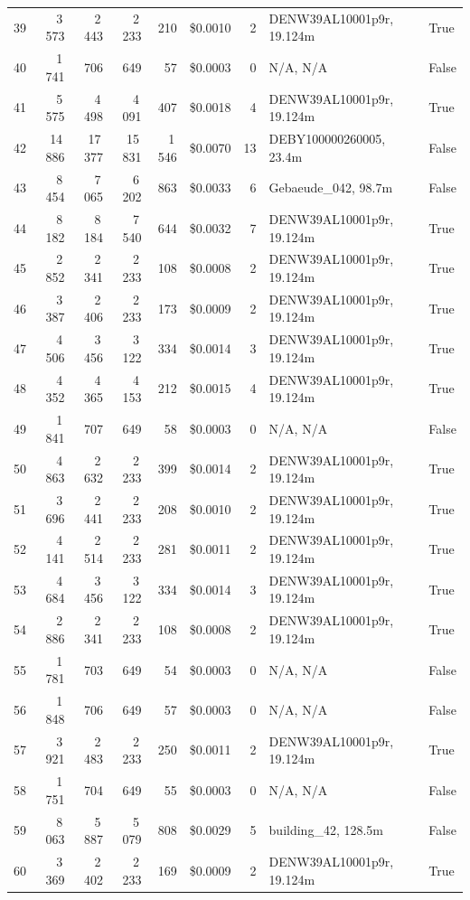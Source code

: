 \documentclass[a4paper,11pt]{article}
\begin{document}
\begin{table}[ht]
\begin{tabular}{r r r r r r r p{3cm} l}
39 & 3\,573 & 2\,443 & 2\,233 & 210 & \$0.0010 & 2 & DENW39AL10001p9r, 19.124m & True \\
40 & 1\,741 & 706 & 649 & 57 & \$0.0003 & 0 & N/A, N/A & False \\
41 & 5\,575 & 4\,498 & 4\,091 & 407 & \$0.0018 & 4 & DENW39AL10001p9r, 19.124m & True \\
42 & 14\,886 & 17\,377 & 15\,831 & 1\,546 & \$0.0070 & 13 & DEBY100000260005, 23.4m & False \\
43 & 8\,454 & 7\,065 & 6\,202 & 863 & \$0.0033 & 6 & Gebaeude\_042, 98.7m & False \\
44 & 8\,182 & 8\,184 & 7\,540 & 644 & \$0.0032 & 7 & DENW39AL10001p9r, 19.124m & True \\
45 & 2\,852 & 2\,341 & 2\,233 & 108 & \$0.0008 & 2 & DENW39AL10001p9r, 19.124m & True \\
46 & 3\,387 & 2\,406 & 2\,233 & 173 & \$0.0009 & 2 & DENW39AL10001p9r, 19.124m & True \\
47 & 4\,506 & 3\,456 & 3\,122 & 334 & \$0.0014 & 3 & DENW39AL10001p9r, 19.124m & True \\
48 & 4\,352 & 4\,365 & 4\,153 & 212 & \$0.0015 & 4 & DENW39AL10001p9r, 19.124m & True \\
49 & 1\,841 & 707 & 649 & 58 & \$0.0003 & 0 & N/A, N/A & False \\
50 & 4\,863 & 2\,632 & 2\,233 & 399 & \$0.0014 & 2 & DENW39AL10001p9r, 19.124m & True \\
51 & 3\,696 & 2\,441 & 2\,233 & 208 & \$0.0010 & 2 & DENW39AL10001p9r, 19.124m & True \\
52 & 4\,141 & 2\,514 & 2\,233 & 281 & \$0.0011 & 2 & DENW39AL10001p9r, 19.124m & True \\
53 & 4\,684 & 3\,456 & 3\,122 & 334 & \$0.0014 & 3 & DENW39AL10001p9r, 19.124m & True \\
54 & 2\,886 & 2\,341 & 2\,233 & 108 & \$0.0008 & 2 & DENW39AL10001p9r, 19.124m & True \\
55 & 1\,781 & 703 & 649 & 54 & \$0.0003 & 0 & N/A, N/A & False \\
56 & 1\,848 & 706 & 649 & 57 & \$0.0003 & 0 & N/A, N/A & False \\
57 & 3\,921 & 2\,483 & 2\,233 & 250 & \$0.0011 & 2 & DENW39AL10001p9r, 19.124m & True \\
58 & 1\,751 & 704 & 649 & 55 & \$0.0003 & 0 & N/A, N/A & False \\
59 & 8\,063 & 5\,887 & 5\,079 & 808 & \$0.0029 & 5 & building\_42, 128.5m & False \\
60 & 3\,369 & 2\,402 & 2\,233 & 169 & \$0.0009 & 2 & DENW39AL10001p9r, 19.124m & True \\

\end{tabular}
\end{table}
\end{document}
